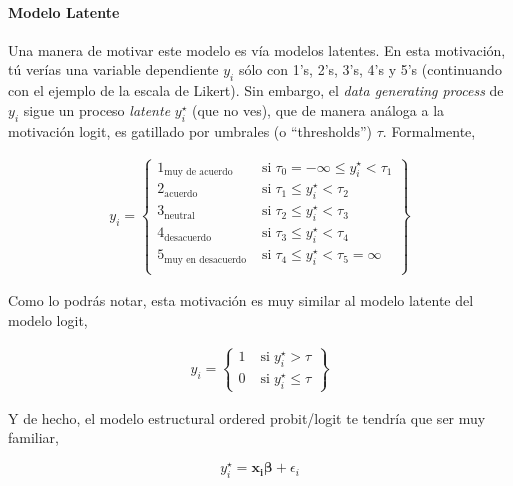 \documentclass[onesided]{article}\usepackage[]{graphicx}\usepackage[]{color}
\begin{document}
\paragraph{Modelo Latente} Una manera de motivar este modelo es v\'ia modelos latentes. En esta motivaci\'on, t\'u ver\'ias una variable dependiente $y_{i}$ s\'olo con 1's, 2's, 3's, 4's y 5's (continuando con el ejemplo de la escala de Likert). Sin embargo, el \emph{data generating process} de $y_{i}$ sigue un proceso \emph{latente} $y_{i}^{\star}$ (que no ves), que de manera an\'aloga a la motivaci\'on logit, es gatillado por umbrales (o ``thresholds'') $\tau$. Formalmente, 


\begin{equation}\label{latente}
\begin{split}
y_{i}=  
  \begin{Bmatrix} 
    1_{\text{muy de acuerdo}} & \;\text{si}\; \tau_{0} = -\infty \leq y_{i}^{\star} < \tau_{1} \\ 
    2_{\text{acuerdo}} & \;\text{si}\; \tau_{1}   \leq y_{i}^{\star} < \tau_{2} \\ 
    3_{\text{neutral}} & \;\text{si}\; \tau_{2}   \leq y_{i}^{\star} < \tau_{3} \\ 
    4_{\text{desacuerdo}} & \;\text{si}\; \tau_{3}   \leq y_{i}^{\star} < \tau_{4} \\ 
    5_{\text{muy en desacuerdo}} & \;\text{si}\; \tau_{4}   \leq y_{i}^{\star} < \tau_{5} = \infty \\ 
  \end{Bmatrix}
\end{split}
\end{equation}

Como lo podr\'as notar, esta motivaci\'on es muy similar al modelo latente del modelo logit,

\begin{equation}\label{logit}
\begin{split}
y_{i}=  
  \begin{Bmatrix} 
    1 & \;\text{si}\; y_{i}^{\star}>\tau \\ 
    0 & \;\text{si}\; y_{i}^{\star}\le\tau 
  \end{Bmatrix}
\end{split}
\end{equation}

Y de hecho, el modelo estructural ordered probit/logit te tendr\'ia que ser muy familiar,

\begin{equation}\label{logit.structural}
y_{i}^{\star} = \boldsymbol{x_{i}}\boldsymbol{\beta} + \epsilon_{i}
\end{equation}
\end{document}
